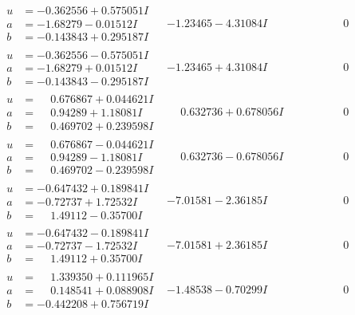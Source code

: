 \documentclass[1p]{elsarticle_modified}
\theoremstyle{definition}
\begin{document}
$$\begin{array}{c|c|c}
\begin{aligned}
u &= -0.362556 + 0.575051 I \\
a &= -1.68279 - 0.01512 I \\
b &= -0.143843 + 0.295187 I\end{aligned}
 & -1.23465 - 4.31084 I & \phantom{-0.000000 } 0 \\ \hline\begin{aligned}
u &= -0.362556 - 0.575051 I \\
a &= -1.68279 + 0.01512 I \\
b &= -0.143843 - 0.295187 I\end{aligned}
 & -1.23465 + 4.31084 I & \phantom{-0.000000 } 0 \\ \hline\begin{aligned}
u &= \phantom{-}0.676867 + 0.044621 I \\
a &= \phantom{-}0.94289 + 1.18081 I \\
b &= \phantom{-}0.469702 + 0.239598 I\end{aligned}
 & \phantom{-}0.632736 + 0.678056 I & \phantom{-0.000000 } 0 \\ \hline\begin{aligned}
u &= \phantom{-}0.676867 - 0.044621 I \\
a &= \phantom{-}0.94289 - 1.18081 I \\
b &= \phantom{-}0.469702 - 0.239598 I\end{aligned}
 & \phantom{-}0.632736 - 0.678056 I & \phantom{-0.000000 } 0 \\ \hline\begin{aligned}
u &= -0.647432 + 0.189841 I \\
a &= -0.72737 + 1.72532 I \\
b &= \phantom{-}1.49112 - 0.35700 I\end{aligned}
 & -7.01581 - 2.36185 I & \phantom{-0.000000 } 0 \\ \hline\begin{aligned}
u &= -0.647432 - 0.189841 I \\
a &= -0.72737 - 1.72532 I \\
b &= \phantom{-}1.49112 + 0.35700 I\end{aligned}
 & -7.01581 + 2.36185 I & \phantom{-0.000000 } 0 \\ \hline\begin{aligned}
u &= \phantom{-}1.339350 + 0.111965 I \\
a &= \phantom{-}0.148541 + 0.088908 I \\
b &= -0.442208 + 0.756719 I\end{aligned}
 & -1.48538 - 0.70299 I & \phantom{-0.000000 } 0 \\ \hline\begin{aligned}

\end{aligned}
\end{array}$$
\end{document}
